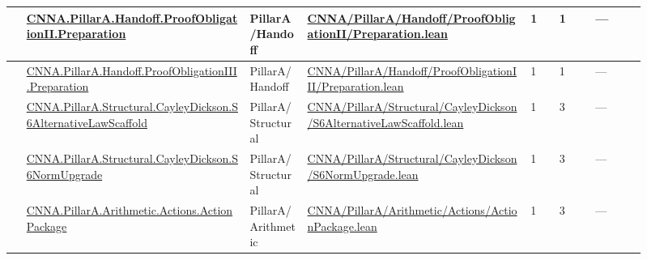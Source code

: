 \begin{longtable}{L{0.025\linewidth} L{0.315\linewidth} L{0.08\linewidth} L{0.315\linewidth} L{0.045\linewidth} L{0.055\linewidth} L{0.07\linewidth}}
\hline
{} & \href{run:repo_snapshot/CNNA/PillarA/Handoff/ProofObligationII/Preparation.lean}{CNNA.\allowbreak{}PillarA.\allowbreak{}Handoff.\allowbreak{}ProofObligationII.\allowbreak{}Preparation} & PillarA/\allowbreak{}Handoff & \href{run:repo_snapshot/CNNA/PillarA/Handoff/ProofObligationII/Preparation.lean}{CNNA/\allowbreak{}PillarA/\allowbreak{}Handoff/\allowbreak{}ProofObligationII/\allowbreak{}Preparation.\allowbreak{}lean} & 1 & 1 & ---\\
\hline
{} & \href{run:repo_snapshot/CNNA/PillarA/Handoff/ProofObligationIII/Preparation.lean}{CNNA.\allowbreak{}PillarA.\allowbreak{}Handoff.\allowbreak{}ProofObligationIII.\allowbreak{}Preparation} & PillarA/\allowbreak{}Handoff & \href{run:repo_snapshot/CNNA/PillarA/Handoff/ProofObligationIII/Preparation.lean}{CNNA/\allowbreak{}PillarA/\allowbreak{}Handoff/\allowbreak{}ProofObligationIII/\allowbreak{}Preparation.\allowbreak{}lean} & 1 & 1 & ---\\
\hline
{} & \href{run:repo_snapshot/CNNA/PillarA/Structural/CayleyDickson/S6AlternativeLawScaffold.lean}{CNNA.\allowbreak{}PillarA.\allowbreak{}Structural.\allowbreak{}CayleyDickson.\allowbreak{}S6AlternativeLawScaffold} & PillarA/\allowbreak{}Structural & \href{run:repo_snapshot/CNNA/PillarA/Structural/CayleyDickson/S6AlternativeLawScaffold.lean}{CNNA/\allowbreak{}PillarA/\allowbreak{}Structural/\allowbreak{}CayleyDickson/\allowbreak{}S6AlternativeLawScaffold.\allowbreak{}lean} & 1 & 3 & ---\\
\hline
{} & \href{run:repo_snapshot/CNNA/PillarA/Structural/CayleyDickson/S6NormUpgrade.lean}{CNNA.\allowbreak{}PillarA.\allowbreak{}Structural.\allowbreak{}CayleyDickson.\allowbreak{}S6NormUpgrade} & PillarA/\allowbreak{}Structural & \href{run:repo_snapshot/CNNA/PillarA/Structural/CayleyDickson/S6NormUpgrade.lean}{CNNA/\allowbreak{}PillarA/\allowbreak{}Structural/\allowbreak{}CayleyDickson/\allowbreak{}S6NormUpgrade.\allowbreak{}lean} & 1 & 3 & ---\\
\hline
{} & \href{run:repo_snapshot/CNNA/PillarA/Arithmetic/Actions/ActionPackage.lean}{CNNA.\allowbreak{}PillarA.\allowbreak{}Arithmetic.\allowbreak{}Actions.\allowbreak{}ActionPackage} & PillarA/\allowbreak{}Arithmetic & \href{run:repo_snapshot/CNNA/PillarA/Arithmetic/Actions/ActionPackage.lean}{CNNA/\allowbreak{}PillarA/\allowbreak{}Arithmetic/\allowbreak{}Actions/\allowbreak{}ActionPackage.\allowbreak{}lean} & 1 & 3 & ---\\

\end{longtable}
